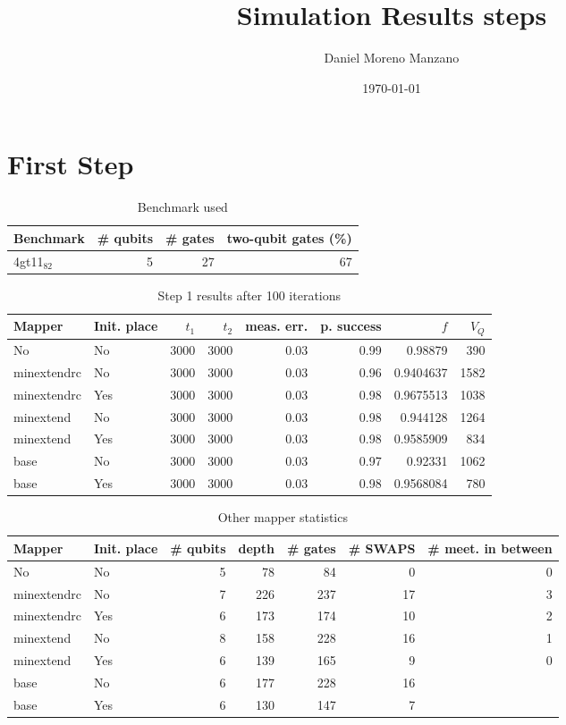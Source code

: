 \documentclass[11pt]{article}
\author{Daniel Moreno Manzano}
\date{\today}
\title{Simulation Results steps}
\begin{document}
\maketitle


\section{First Step}
\label{sec:org0c2f744}

\begin{table}[!htpb]
\caption{\label{tab:orgc2f8638}
Benchmark used}
\centering
\begin{tabular}{lrrr}
\hline
Benchmark & \# qubits & \# gates & two-qubit gates (\%)\\
\hline
4gt11\(_{\text{82}}\) & 5 & 27 & 67\\
\hline
\end{tabular}
\end{table}

\begin{table}[!htpb]
\caption{\label{tab:orgbccaa94}
Step 1 results after 100 iterations}
\centering
\begin{tabular}{llrrrrrr}
\hline
Mapper & Init. place & \(t_1\) & \(t_2\) & meas. err. & p. success & \(f\) & \(V_Q\)\\
\hline
No & No & 3000 & 3000 & 0.03 & 0.99 & 0.98879 & 390\\
\hline
minextendrc & No & 3000 & 3000 & 0.03 & 0.96 & 0.9404637 & 1582\\
minextendrc & Yes & 3000 & 3000 & 0.03 & 0.98 & 0.9675513 & 1038\\
minextend & No & 3000 & 3000 & 0.03 & 0.98 & 0.944128 & 1264\\
minextend & Yes & 3000 & 3000 & 0.03 & 0.98 & 0.9585909 & 834\\
base & No & 3000 & 3000 & 0.03 & 0.97 & 0.92331 & 1062\\
base & Yes & 3000 & 3000 & 0.03 & 0.98 & 0.9568084 & 780\\
\hline
\end{tabular}
\end{table}

\begin{table}[!htpb]
\caption{\label{tab:org14ecd89}
Other mapper statistics}
\centering
\small
\begin{tabular}{llrrrrr}
\hline
Mapper & Init. place & \# qubits & depth & \# gates & \# SWAPS & \# meet. in between\\
\hline
No & No & 5 & 78 & 84 & 0 & 0\\
\hline
minextendrc & No & 7 & 226 & 237 & 17 & 3\\
minextendrc & Yes & 6 & 173 & 174 & 10 & 2\\
minextend & No & 8 & 158 & 228 & 16 & 1\\
minextend & Yes & 6 & 139 & 165 & 9 & 0\\
base & No & 6 & 177 & 228 & 16 & \\
base & Yes & 6 & 130 & 147 & 7 & \\
\hline
\end{tabular}
\end{table}
\end{document}
